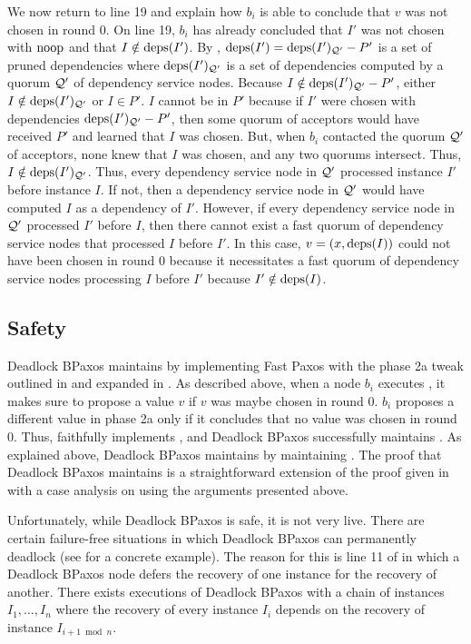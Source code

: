 We now return to line 19 and explain how $b_i$ is able to conclude that $v$ was
not chosen in round $0$. On line 19, $b_i$ has already concluded that $I'$ was
not chosen with $\text{noop}$ and that $I \notin \text{deps}(I')$. By
, $\text{deps}(I') = \text{deps}(I')_{\mathcal{Q}'} - P'$ is a set
of pruned dependencies where $\text{deps}(I')_{\mathcal{Q}'}$ is a set of dependencies
computed by a quorum $\mathcal{Q}'$ of dependency service nodes. Because $I \notin
\text{deps}(I')_{\mathcal{Q}'} - P'$, either $I \notin \text{deps}(I')_{\mathcal{Q}'}$ or $I \in
P'$.
%
$I$ cannot be in $P'$ because if $I'$ were chosen with dependencies
$\text{deps}(I')_{\mathcal{Q}'} - P'$, then some quorum of acceptors would have received
$P'$ and learned that $I$ was chosen. But, when $b_i$ contacted the quorum
$\mathcal{Q}'$ of acceptors, none knew that $I$ was chosen, and any two quorums
intersect.
%
Thus, $I \notin \text{deps}(I')_{\mathcal{Q}'}$. Thus, every dependency service node in
$\mathcal{Q}'$ processed instance $I'$ before instance $I$. If not, then a
dependency service node in $\mathcal{Q}'$ would have computed $I$ as a dependency
of $I'$. However, if every dependency service node in $\mathcal{Q}'$ processed $I'$
before $I$, then there cannot exist a fast quorum of dependency service nodes
that processed $I$ before $I'$. In this case, $v = (x, \text{deps}(I))$ could not
have been chosen in round $0$ because it necessitates a fast quorum of
dependency service nodes processing $I$ before $I'$ because $I' \notin
\text{deps}(I)$.

\subsection{Safety}
Deadlock BPaxos maintains  by implementing Fast
Paxos with the phase 2a tweak outlined in  and expanded
in . As described above, when a node $b_i$ executes
, it makes sure to propose a value $v$ if $v$ was maybe
chosen in round $0$. $b_i$ proposes a different value in phase 2a only if it
concludes that no value was chosen in round $0$. Thus, 
faithfully implements , and Deadlock BPaxos
successfully maintains .
%
As explained above, Deadlock BPaxos maintains  by
maintaining . The proof that Deadlock BPaxos
maintains  is a straightforward extension of the
proof given in  with a case analysis on
 using the arguments presented above.

Unfortunately, while Deadlock BPaxos is safe, it is not very live. There are
certain failure-free situations in which Deadlock BPaxos can permanently
deadlock (see  for a concrete example). The reason for
this is line 11 of  in which a Deadlock BPaxos node
defers the recovery of one instance for the recovery of another. There exists
executions of Deadlock BPaxos with a chain of instances $I_1, \ldots, I_n$
where the recovery of every instance $I_i$ depends on the recovery of instance
$I_{i+1 \bmod n}$.
